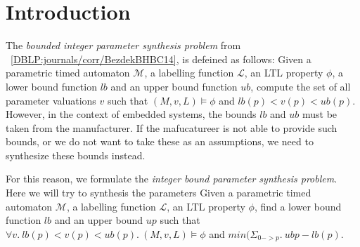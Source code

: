 \section{Introduction}

The \textit{bounded integer parameter synthesis problem} from ~\ref{DBLP:journals/corr/BezdekBHBC14}, is defeined as follows:
Given a parametric timed automaton $\mathcal{M}$, a labelling
function $\mathcal{L}$, an LTL property $\phi$, a lower bound function $lb$ and an upper bound
function $ub$, compute the set of all parameter valuations $v$ such that $(M, v,L) \models \phi$ and $lb(p) < v(p) < ub(p)$.
However, in the context of embedded systems, the bounds $lb$ and $ub$ must be taken from the manufacturer.
If the mafucatureer is not able to provide such bounds, or we do not want to take these as an assumptions, we need to synthesize these bounds instead.

For this reason, we formulate the \textit{integer bound parameter synthesis problem}.
Here we will try to synthesis the parameters
Given a parametric timed automaton $\mathcal{M}$, a labelling function $\mathcal{L}$, an LTL property $\phi$, 
find a lower bound function $lb$ and an upper bound $up$ such that $\forall v.\ lb(p) < v(p) < ub(p).\ (M, v,L) \models \phi$ and $min(\Sigma_{0->p}.\ ub{p}-lb(p)$.


